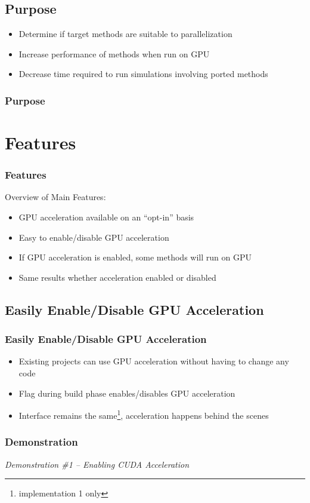 \documentclass{beamer}
\begin{document}
\subsection{Purpose}
\begin{frame}
\begin{itemize}
\item Determine if target methods are suitable to parallelization 
\item Increase performance of methods when run on GPU
\item Decrease time required to run simulations involving ported methods
\end{itemize}
\frametitle{Purpose}
\end{frame}

\section{Features}
\begin{frame}
\frametitle{Features}
Overview of Main Features:
\begin{itemize}
\item GPU acceleration available on an ``opt-in'' basis
\item Easy to enable/disable GPU acceleration
\item If GPU acceleration is enabled, some methods will run on GPU
\item Same results whether acceleration enabled or disabled
\end{itemize}
\end{frame}

\subsection{Easily Enable/Disable GPU Acceleration}
\begin{frame}
\frametitle{Easily Enable/Disable GPU Acceleration}
\begin{itemize}
\item Existing projects can use GPU acceleration without having to change any code 
\item Flag during build phase enables/disables GPU acceleration
\item Interface remains the same\footnote{implementation 1 only}, acceleration happens behind the scenes
\end{itemize}
\end{frame}

\begin{frame}
\frametitle{Demonstration}
\begin{center}
\emph{Demonstration  \#1 -- Enabling CUDA Acceleration}
\end{center}
\end{frame}
\end{document}
